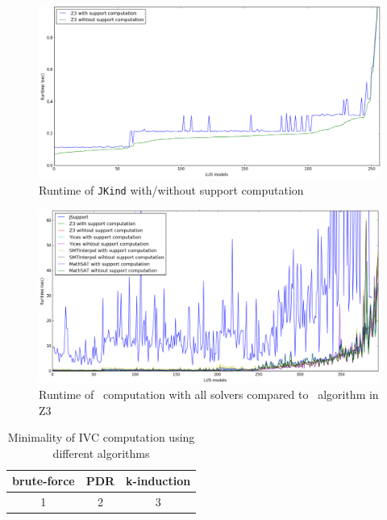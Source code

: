 \begin{figure}
  \centering
  \includegraphics[width=\columnwidth]{figs/runtimeZ3.png}
  \caption{Runtime of \texttt{JKind} with/without support computation}\label{fig:runtimez3}
\end{figure}


\begin{figure}
  \centering
  \includegraphics[width=\columnwidth]{figs/runtimeAll.png}
  \caption{Runtime of \ucalg\ computation with all solvers compared to \bfalg\ algorithm in Z3}\label{fig:runtimeall}
\end{figure}

\begin{table}
  \centering
  \begin{tabular}{ |c|c|c| }
    \hline
     brute-force & PDR & k-induction \\
    \hline
      1 & 2 & 3  \\
    \hline
  \end{tabular}
  \caption{Minimality of IVC computation using different algorithms}
  \label{tab:minimality-algorithm}
\end{table}

